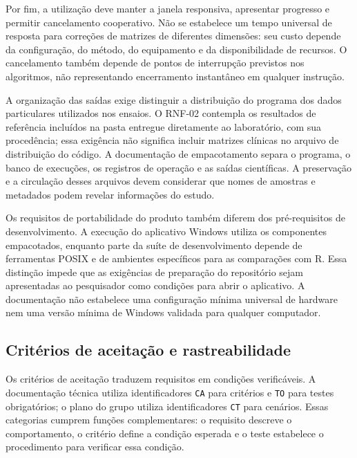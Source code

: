 Por fim, a utilização deve manter a janela responsiva, apresentar progresso e permitir cancelamento cooperativo. Não se estabelece um tempo universal de resposta para correções de matrizes de diferentes dimensões: seu custo depende da configuração, do método, do equipamento e da disponibilidade de recursos. O cancelamento também depende de pontos de interrupção previstos nos algoritmos, não representando encerramento instantâneo em qualquer instrução.

A organização das saídas exige distinguir a distribuição do programa dos dados particulares utilizados nos ensaios. O RNF-02 contempla os resultados de referência incluídos na pasta entregue diretamente ao laboratório, com sua procedência; essa exigência não significa incluir matrizes clínicas no arquivo de distribuição do código. A documentação de empacotamento separa o programa, o banco de execuções, os registros de operação e as saídas científicas. A preservação e a circulação desses arquivos devem considerar que nomes de amostras e metadados podem revelar informações do estudo.

Os requisitos de portabilidade do produto também diferem dos pré-requisitos de desenvolvimento. A execução do aplicativo Windows utiliza os componentes empacotados, enquanto parte da suíte de desenvolvimento depende de ferramentas POSIX e de ambientes específicos para as comparações com R. Essa distinção impede que as exigências de preparação do repositório sejam apresentadas ao pesquisador como condições para abrir o aplicativo. A documentação não estabelece uma configuração mínima universal de hardware nem uma versão mínima de Windows validada para qualquer computador.

\subsection{Critérios de aceitação e rastreabilidade}

Os critérios de aceitação traduzem requisitos em condições verificáveis. A documentação técnica utiliza identificadores \texttt{CA} para critérios e \texttt{TO} para testes obrigatórios; o plano do grupo utiliza identificadores \texttt{CT} para cenários. Essas categorias cumprem funções complementares: o requisito descreve o comportamento, o critério define a condição esperada e o teste estabelece o procedimento para verificar essa condição.

